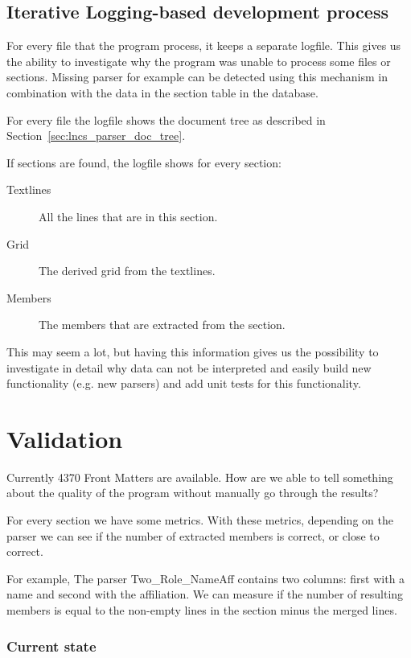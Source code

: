 \documentclass{ou-report}
\begin{document}
\subsection{Iterative Logging-based development process}
For every file that the program process, it keeps a separate logfile. This gives
us the ability to investigate why the program was unable to process some files 
or sections. Missing parser for example can be detected using this mechanism in
combination with the data in the section table in the database.

For every file the logfile shows the document tree as described in 
Section~\ref{sec:lncs_parser_doc_tree}. 

If sections are found, the logfile shows for every section:
\begin{description}
    \item[Textlines] All the lines that are in this section.
    \item[Grid] The derived grid from the textlines.
    \item[Members] The members that are extracted from the section.
\end{description}
This may seem a lot, but having this information gives us the possibility to 
investigate in detail why data can not be interpreted and easily build new 
functionality (e.g. new parsers) and add unit tests for this functionality.

\section{Validation}
\label{sec:front_matter_validation}
Currently 4370 Front Matters are available. How are we able to tell something 
about the quality of the program without manually go through the results?

For every section we have some metrics. With these metrics, depending on the
parser we can see if the number of extracted members is correct, or close to
correct.

For example, The parser Two\_Role\_NameAff contains two columns: first with a name
and second with the affiliation. We can measure if the number of resulting 
members is equal to the non-empty lines in the section minus the merged lines.



\subsubsection{Current state}
\end{document}

